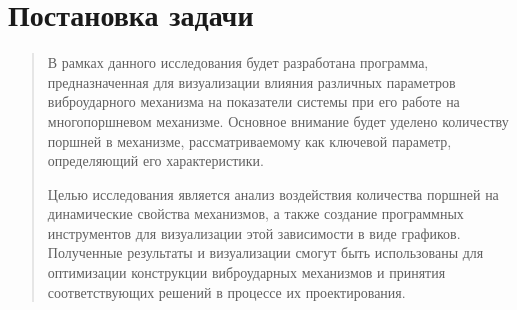 \section{Постановка задачи}

\begin{quote}
В рамках данного исследования будет разработана программа, предназначенная для визуализации влияния различных параметров виброударного механизма на показатели системы при его работе на многопоршневом механизме. Основное внимание будет уделено количеству поршней в механизме, рассматриваемому как ключевой параметр, определяющий его характеристики. 

Целью исследования является анализ воздействия количества поршней на динамические свойства механизмов, а также создание программных инструментов для визуализации этой зависимости в виде графиков. Полученные результаты и визуализации смогут быть использованы для оптимизации конструкции виброударных механизмов и принятия соответствующих решений в процессе их проектирования.
\end{quote}